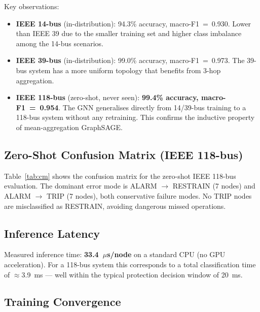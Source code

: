 \documentclass[11pt,a4paper]{article}
\begin{document}
Key observations:
\begin{itemize}
  \item \textbf{IEEE 14-bus} (in-distribution): 94.3\% accuracy,
        macro-F1~=~0.930. Lower than IEEE 39 due to the smaller training set
        and higher class imbalance among the 14-bus scenarios.
  \item \textbf{IEEE 39-bus} (in-distribution): 99.0\% accuracy,
        macro-F1~=~0.973. The 39-bus system has a more uniform topology
        that benefits from 3-hop aggregation.
  \item \textbf{IEEE 118-bus} (zero-shot, never seen): \textbf{99.4\% accuracy,
        macro-F1~=~0.954}. The GNN generalises directly from 14/39-bus training
        to a 118-bus system without any retraining.  This confirms the
        inductive property of mean-aggregation GraphSAGE.
\end{itemize}

\subsection{Zero-Shot Confusion Matrix (IEEE 118-bus)}

Table~\ref{tab:cm} shows the confusion matrix for the zero-shot IEEE 118-bus
evaluation.  The dominant error mode is ALARM $\to$ RESTRAIN (7 nodes) and
ALARM $\to$ TRIP (7 nodes), both conservative failure modes.  No TRIP nodes
are misclassified as RESTRAIN, avoiding dangerous missed operations.

\begin{table}[h]
\centering
\caption{Confusion matrix --- zero-shot IEEE 118-bus (50 scenarios, 5900 node-decisions).}
\label{tab:cm}

\end{table}

\subsection{Inference Latency}

Measured inference time: \textbf{33.4~$\mu$s/node} on a standard CPU
(no GPU acceleration).  For a 118-bus system this corresponds to a total
classification time of $\approx$3.9~ms --- well within the typical
protection decision window of 20~ms.

\subsection{Training Convergence}
\end{document}

